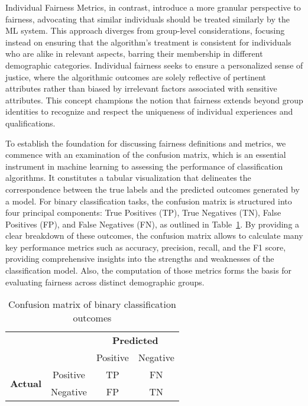 Individual Fairness Metrics, in contrast, introduce a more granular perspective to fairness, advocating that similar individuals should be treated similarly by the ML system. This approach diverges from group-level considerations, focusing instead on ensuring that the algorithm’s treatment is consistent for individuals who are alike in relevant aspects, barring their membership in different demographic categories. Individual fairness seeks to ensure a personalized sense of justice, where the algorithmic outcomes are solely reflective of pertinent attributes rather than biased by irrelevant factors associated with sensitive attributes. This concept champions the notion that fairness extends beyond group identities to recognize and respect the uniqueness of individual experiences and qualifications.

To establish the foundation for discussing fairness definitions and metrics, we commence with an examination of the confusion matrix, which is an essential instrument in machine learning to assessing the performance of classification algorithms. It constitutes a tabular visualization that delineates the correspondence between the true labels and the predicted outcomes generated by a model. For binary classification tasks, the confusion matrix is structured into four principal components: True Positives (TP), True Negatives (TN), False Positives (FP), and False Negatives (FN), as outlined in Table~\ref{tab:confusion_matrix_definition}. By providing a clear breakdown of these outcomes, the confusion matrix allows to calculate many key performance metrics such as accuracy, precision, recall, and the F1 score, providing comprehensive insights into the strengths and weaknesses of the classification model. Also, the computation of those metrics forms the basis for evaluating fairness across distinct demographic groups.

\begin{table}[h]
    \centering
    \caption{Confusion matrix of binary classification outcomes} \label{tab:confusion_matrix_definition}
    \begin{tabular}{cc|c|c|}
    \cline{3-4}
     & & \multicolumn{2}{c|}{\textbf{Predicted}} \\ \cline{3-4}
     & & Positive & Negative \\ \hline
    \multicolumn{1}{|c|}{\multirow{2}{*}{\textbf{Actual}}} & Positive & TP & FN \\ \cline{2-4}
    \multicolumn{1}{|c|}{} & Negative & FP & TN \\ \hline
    \end{tabular}
\end{table}


